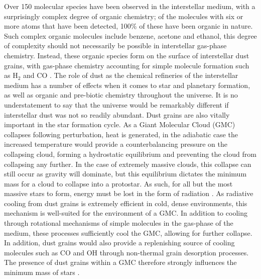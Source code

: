 Over 150 molecular species have been observed in the interstellar medium, with a surprisingly complex degree of organic chemistry; of the molecules with six or more atoms that have been detected, 100\% of these have been organic in nature.
Such complex organic molecules include benzene, acetone and ethanol, this degree of complexity should not necessarily be possible in interstellar gas-phase chemistry.
Instead, these organic species form on the surface of interstellar dust grains, with gas-phase chemistry accounting for simple molecule formation such as $\text{H}_2$ and $\text{CO}$
\parencite{herbstComplexOrganicInterstellar2009}.
The role of dust as the chemical refineries of the interstellar medium has a number of effects when it comes to star and planetary formation, as well as organic and pre-biotic chemistry throughout the universe.
It is no understatement to say that the universe would be remarkably different if interstellar dust was not so readily abundant.
Dust grains are also vitally important in the star formation cycle.
As a Giant Molecular Cloud (GMC) collapses following perturbation, heat is generated, in the adiabatic case the increased temperature would provide a counterbalancing pressure on the collapsing cloud, forming a hydrostatic equilibrium and preventing the cloud from collapsing any further.
In the case of extremely massive clouds, this collapse can still occur as gravity will dominate, but this equilibrium dictates the minimum mass for a cloud to collapse into a protostar.
As such, for all but the most massive stars to form, energy must be lost in the form of radiation
\parencite{ward-thompsonIntroductionStarFormation2011}.
As radiative cooling from dust grains is extremely efficient in cold, dense environments, this mechanism is well-suited for the environment of a GMC.
In addition to cooling through rotational mechanisms of simple molecules in the gas-phase of the medium, these processes sufficiently cool the GMC, allowing for further collapse.
In addition, dust grains would also provide a replenishing source of cooling molecules such as CO and OH through non-thermal grain desorption processes.
The presence of dust grains within a GMC therefore strongly influences the minimum mass of stars
\parencite{williamsChemistryCosmicDust2015}.

